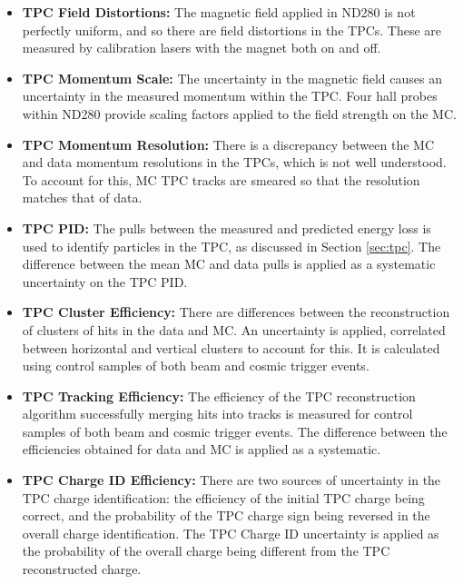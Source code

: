 \begin{itemize}

\item \textbf{TPC Field Distortions:} The magnetic field applied in ND280 is not perfectly uniform, and so there are field distortions in the TPCs. These are measured by calibration lasers with the magnet both on and off.

\item \textbf{TPC Momentum Scale:} The uncertainty in the magnetic field causes an uncertainty in the measured momentum within the TPC. Four hall probes within ND280 provide scaling factors applied to the field strength on the MC.

\item \textbf{TPC Momentum Resolution:} There is a discrepancy between the MC and data momentum resolutions in the TPCs, which is not well understood. To account for this, MC TPC tracks are smeared so that the resolution matches that of data. 

\item \textbf{TPC PID:} The pulls between the measured and predicted energy loss is used to identify particles in the TPC, as discussed in Section \ref{sec:tpc}. The difference between the mean MC and data pulls is applied as a systematic uncertainty on the TPC PID.

\item \textbf{TPC Cluster Efficiency:} There are differences between the reconstruction of clusters of hits in the data and MC. An uncertainty is applied, correlated between horizontal and vertical clusters to account for this. It is calculated using control samples of both beam and cosmic trigger events.

\item \textbf{TPC Tracking Efficiency:} The efficiency of the TPC reconstruction algorithm successfully merging hits into tracks is measured for control samples of both beam and cosmic trigger events. The difference between the efficiencies obtained for data and MC is applied as a systematic.

\item \textbf{TPC Charge ID Efficiency:} There are two sources of uncertainty in the TPC charge identification: the efficiency of the initial TPC charge being correct, and the probability of the TPC charge sign being reversed in the overall charge identification. The TPC Charge ID uncertainty is applied as the probability of the overall charge being different from the TPC reconstructed charge.


\end{itemize}

